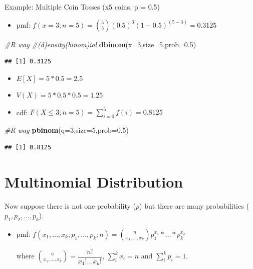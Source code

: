 \documentclass[]{book}
\newenvironment{Shaded}{\begin{snugshade}}{\end{snugshade}}
\newcommand{\CommentTok}[1]{\textcolor[rgb]{0.56,0.35,0.01}{\textit{#1}}}
\newcommand{\DataTypeTok}[1]{\textcolor[rgb]{0.13,0.29,0.53}{#1}}
\newcommand{\DecValTok}[1]{\textcolor[rgb]{0.00,0.00,0.81}{#1}}
\newcommand{\FloatTok}[1]{\textcolor[rgb]{0.00,0.00,0.81}{#1}}
\newcommand{\KeywordTok}[1]{\textcolor[rgb]{0.13,0.29,0.53}{\textbf{#1}}}
\newcommand{\NormalTok}[1]{#1}
\providecommand{\tightlist}{%
  \setlength{\itemsep}{0pt}\setlength{\parskip}{0pt}}
\theoremstyle{definition}
\theoremstyle{definition}
\theoremstyle{definition}
\theoremstyle{remark}
\begin{document}
Example: Multiple Coin Tosses (x5 coins, p = 0.5)

\begin{itemize}
\tightlist
\item
  pmf: \(f(x=3;n=5) = \binom{5}{3} (0.5)^3(1-0.5)^{(5-3)} = 0.3125\)
\end{itemize}

\begin{Shaded}
\begin{Highlighting}[]
\CommentTok{#R way}
\CommentTok{#(d)ensity(binom)ial}
\KeywordTok{dbinom}\NormalTok{(}\DataTypeTok{x=}\DecValTok{3}\NormalTok{,}\DataTypeTok{size=}\DecValTok{5}\NormalTok{,}\DataTypeTok{prob=}\FloatTok{0.5}\NormalTok{)}
\end{Highlighting}
\end{Shaded}

\begin{verbatim}
## [1] 0.3125
\end{verbatim}

\begin{itemize}
\item
  \(E[X] = 5*0.5 = 2.5\)
\item
  \(V(X) = 5*0.5*0.5 = 1.25\)
\item
  cdf: \(F(X \le 3;n=5) = \sum_{i=0}^5 f(i) = 0.8125\)
\end{itemize}

\begin{Shaded}
\begin{Highlighting}[]
\CommentTok{#R way}
\KeywordTok{pbinom}\NormalTok{(}\DataTypeTok{q=}\DecValTok{3}\NormalTok{,}\DataTypeTok{size=}\DecValTok{5}\NormalTok{,}\DataTypeTok{prob=}\FloatTok{0.5}\NormalTok{)}
\end{Highlighting}
\end{Shaded}

\begin{verbatim}
## [1] 0.8125
\end{verbatim}

\hypertarget{multinomial-distribution}{%
\section{Multinomial Distribution}\label{multinomial-distribution}}

Now suppose there is not one probability (\(p\)) but there are many
probabilities (\(p_1, p_2, \dots, p_k\)).

\begin{itemize}
\item
  pmf:
  \(f(x_1, \dots , x_k;p_1, \dots, p_k;n) = \binom{n}{x_1, \dots , x_k} p_1^{x_1}*\dots *p_k^{x_k}\)

  where \(\binom{n}{x_1, \dots , x_k} = \dfrac{n!}{x_1! \dots x_k!}\),
  \(\sum_i^k x_i = n\) and \(\sum_i^k p_i = 1\).
\end{itemize}
\end{document}
